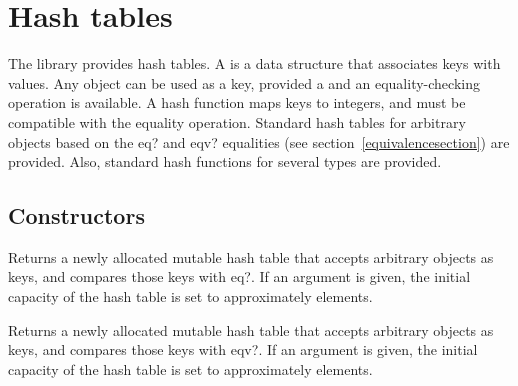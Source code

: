 \section{Hash tables}
\label{hashtablesection}

The  library provides hash tables.
A  is a data structure that associates keys with values.
Any object can be used as a key, provided a 
and an equality-checking operation is available.  A hash function maps
keys to integers, and must be compatible with the equality operation.  
Standard hash tables for arbitrary objects based on the {\cf eq?} and 
{\cf eqv?} equalities (see section~\ref{equivalencesection}) are provided.  
Also, standard hash functions for several types are provided.

\subsection{Constructors}


\begin{entry}{%
}

Returns a newly allocated mutable hash table that accepts
arbitrary objects as keys,
and compares those keys with {\cf eq?}. If an argument is given, the initial 
capacity of the hash table is set to approximately  elements.

\end{entry}

\begin{entry}{%
}

Returns a newly allocated mutable hash table that accepts
arbitrary objects as keys,
and compares those keys with {\cf eqv?}.
If an argument is given, the initial 
capacity of the hash table is set to approximately  elements.

\end{entry}

